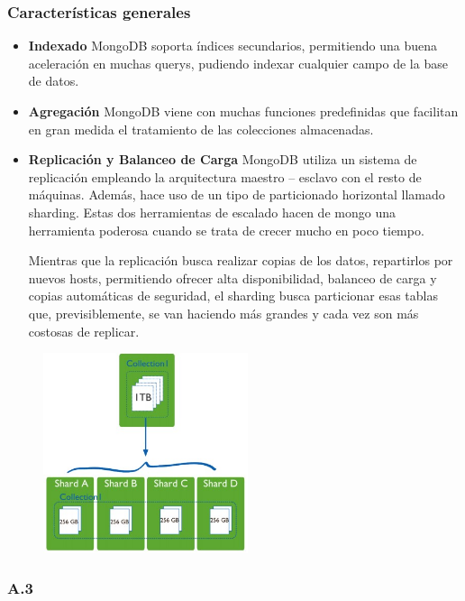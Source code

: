 \documentclass[preprint,12pt]{elsarticle}
\begin{document}
\subsubsection{\textbf{Características generales}}
\begin{itemize}
\item 
\textbf{Indexado}\newline
MongoDB soporta índices secundarios, permitiendo una buena aceleración en muchas querys, pudiendo indexar cualquier campo de la base de datos.
\item 
\textbf{Agregación}\newline
MongoDB viene con muchas funciones predefinidas que facilitan en gran medida el tratamiento de las colecciones almacenadas.
\item
\textbf{Replicación y Balanceo de Carga}\newline
MongoDB utiliza un sistema de replicación empleando la arquitectura maestro – esclavo con el resto de máquinas. Además, hace uso de un tipo de particionado horizontal llamado sharding. Estas dos herramientas de escalado hacen de mongo una herramienta poderosa cuando se trata de crecer mucho en poco tiempo.

Mientras que la replicación busca realizar copias de los datos, repartirlos por nuevos hosts, permitiendo ofrecer alta disponibilidad, balanceo de carga y copias automáticas de seguridad, el sharding busca particionar esas tablas que, previsiblemente, se van haciendo más grandes y cada vez son más costosas de replicar.
\end{itemize}


\begin{figure}[htb]
	\begin{center}
		\includegraphics[width=6cm]{./IMAGENES/img01} %
	\end{center}
\end{figure}

\subsubsection{\textbf{A.3}}
\end{document}
